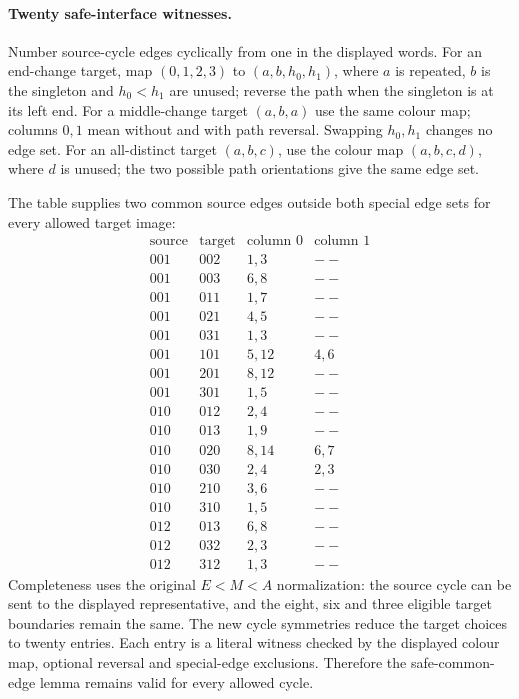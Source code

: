 \paragraph{Twenty safe-interface witnesses.}
Number source-cycle edges cyclically from one in the displayed words.
For an end-change target, map $(0,1,2,3)$ to $(a,b,h_0,h_1)$,
where $a$ is repeated, $b$ is the singleton and $h_0<h_1$ are unused;
reverse the path when the singleton is at its left end.
For a middle-change target $(a,b,a)$ use the same colour map;
columns $0,1$ mean without and with path reversal. Swapping
$h_0,h_1$ changes no edge set. For an all-distinct target $(a,b,c)$,
use the colour map $(a,b,c,d)$, where $d$ is unused; the two possible
path orientations give the same edge set.

The table supplies two common source edges outside both special
edge sets for every allowed target image:
\[
\begin{array}{c|c|c|c}
\text{source}&\text{target}&\text{column }0&\text{column }1\\\hline
001&002&1,3&--\\
001&003&6,8&--\\
001&011&1,7&--\\
001&021&4,5&--\\
001&031&1,3&--\\
001&101&5,12&4,6\\
001&201&8,12&--\\
001&301&1,5&--\\
010&012&2,4&--\\
010&013&1,9&--\\
010&020&8,14&6,7\\
010&030&2,4&2,3\\
010&210&3,6&--\\
010&310&1,5&--\\
012&013&6,8&--\\
012&032&2,3&--\\
012&312&1,3&--
\end{array}
\]
Completeness uses the original $E<M<A$ normalization: the source
cycle can be sent to the displayed representative, and the eight,
six and three eligible target boundaries remain the same. The new
cycle symmetries reduce the target choices to twenty entries.
Each entry is a literal witness checked by the displayed colour
map, optional reversal and special-edge exclusions. Therefore the
safe-common-edge lemma remains valid for every allowed cycle.


